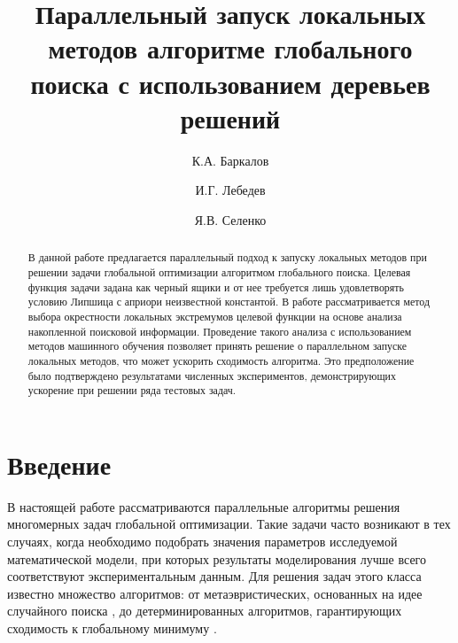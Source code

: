 \documentclass[runningheads]{llncs}
\begin{document}
%
\title{Параллельный запуск локальных методов алгоритме глобального поиска с использованием деревьев решений}
%
%
\author{К.А. Баркалов \and
И.Г. Лебедев \and
Я.В. Селенко}
%
%
%
\maketitle              %
%
\begin{abstract}
В данной работе предлагается параллельный подход к запуску локальных методов при решении задачи глобальной оптимизации алгоритмом глобального поиска. Целевая функция задачи задана как черный ящики и от нее требуется лишь удовлетворять условию Липшица с априори неизвестной константой. В работе рассматривается метод выбора окрестности локальных экстремумов целевой функции на основе анализа накопленной поисковой информации. Проведение такого анализа с использованием методов машинного обучения позволяет принять решение о параллельном запуске локальных методов, что может ускорить сходимость алгоритма. Это предположение было подтверждено результатами численных экспериментов, демонстрирующих ускорение при решении ряда тестовых задач.

\end{abstract}
%
%
%



\section{Введение}

В настоящей работе рассматриваются параллельные алгоритмы решения многомерных задач глобальной оптимизации. Такие задачи часто возникают в тех случаях, когда необходимо подобрать значения параметров исследуемой математической модели, при которых результаты моделирования лучше всего соответствуют экспериментальным данным. Для решения задач этого класса известно множество алгоритмов: от метаэвристических, основанных на идее случайного поиска \cite{Ferreiro2013,Garcia2014,Langdon2011}, до детерминированных алгоритмов, гарантирующих сходимость к глобальному минимуму \cite{Evtushenko2009,He2008,Paulavicius2011}.
\end{document}
